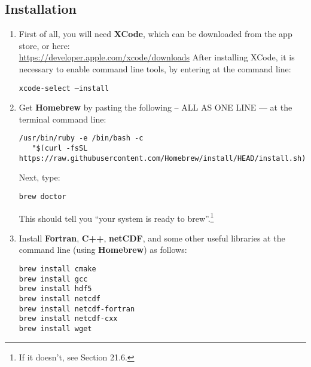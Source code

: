 \documentclass[10pt,twoside]{article}
\begin{document}
\subsection{Installation}

\begin{enumerate}[noitemsep]

\vspace{1mm}
\item First of all, you will need \textbf{XCode}, which can be downloaded from the app store, or here:
\vspace{1mm}
\\\href{https://developer.apple.com/xcode/downloads}{https://developer.apple.com/xcode/downloads}
\vspace{1mm}
After installing XCode, it is necessary to enable command line tools, by entering at the command line:
\vspace{-2pt}
\begin{verbatim}
xcode-select –install
\end{verbatim}
\vspace{-2pt}

\vspace{1mm}
\item Get \textbf{Homebrew} by pasting the following -- ALL AS ONE LINE --- at the terminal command line:
\vspace{-2pt}
\begin{verbatim}
/usr/bin/ruby -e /bin/bash -c 
   "$(curl -fsSL https://raw.githubusercontent.com/Homebrew/install/HEAD/install.sh)"
\end{verbatim}
\vspace{-2pt}

Next, type:
\vspace{-2pt}
\begin{verbatim}
brew doctor
\end{verbatim}
\vspace{-2pt}
This should tell you “your system is ready to brew”.\footnote{If it doesn’t, see Section 21.6.} 

\vspace{1mm}
\item Install \textbf{Fortran}, \textbf{C++}, \textbf{netCDF}, and some other useful libraries at the command line (using \textbf{Homebrew}) as follows:
\vspace{-2pt}
\begin{verbatim}
brew install cmake
brew install gcc
brew install hdf5
brew install netcdf
brew install netcdf-fortran
brew install netcdf-cxx
brew install wget
\end{verbatim}
\vspace{-2pt}


\end{enumerate}
\end{document}
